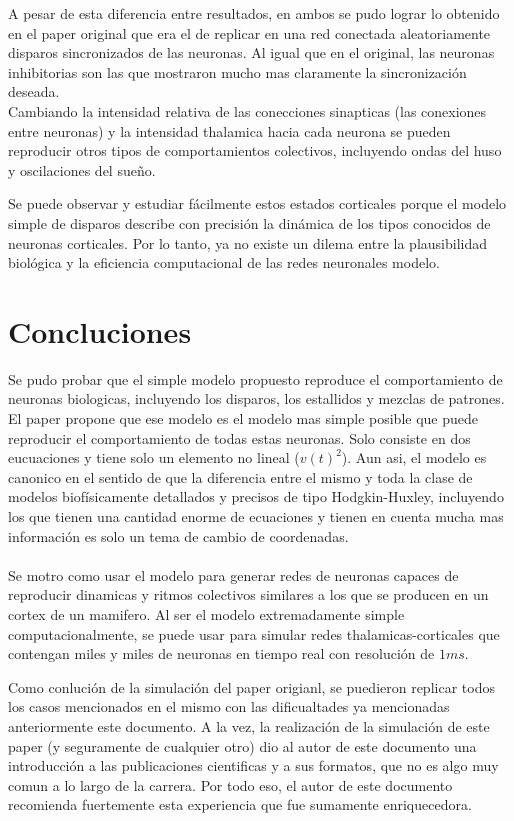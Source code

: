 \documentclass[12pt]{article}
\begin{document}
A pesar de esta diferencia entre resultados, en ambos se pudo lograr lo obtenido en el paper original que era el de replicar en una red conectada aleatoriamente disparos sincronizados de las neuronas.
Al igual que en el original, las neuronas inhibitorias son las que mostraron mucho mas claramente la sincronización deseada. \\

Cambiando la intensidad relativa de las conecciones sinapticas (las conexiones entre neuronas) y la intensidad thalamica hacia cada neurona se pueden reproducir otros tipos de comportamientos
colectivos, incluyendo ondas del huso y oscilaciones del sueño.

Se puede observar y estudiar fácilmente estos estados corticales porque el modelo simple de disparos describe con precisión la dinámica de los tipos conocidos
de neuronas corticales. Por lo tanto, ya no existe un dilema entre la plausibilidad biológica y la eficiencia computacional de las redes neuronales modelo.

\section{Concluciones}

Se pudo probar que el simple modelo propuesto reproduce el comportamiento de neuronas biologicas, incluyendo los disparos, los estallidos y mezclas de patrones. El paper propone que ese modelo es el modelo mas simple posible que puede reproducir el comportamiento de todas estas neuronas.
Solo consiste en dos eucuaciones y tiene solo un elemento no lineal ($v(t)^2$). Aun asi, el modelo es canonico en el sentido de que la diferencia entre el mismo y toda la clase de modelos biofísicamente detallados y precisos de tipo Hodgkin-Huxley, incluyendo los que tienen una cantidad enorme de ecuaciones y tienen en cuenta mucha mas información es solo un tema de cambio de coordenadas. \\ \\

Se motro como usar el modelo para generar redes de neuronas capaces de reproducir dinamicas y ritmos colectivos similares a los que se producen en un cortex de un mamifero.
Al ser el modelo extremadamente simple computacionalmente, se puede usar para simular redes thalamicas-corticales que contengan miles y miles de neuronas en tiempo real con resolución de $1 ms$.

Como conlución de la simulación del paper origianl, se puedieron replicar todos los casos mencionados en el mismo con las dificualtades ya mencionadas anteriormente este documento.
A la vez, la realización de la simulación de este paper (y seguramente de cualquier otro) dio al autor de este documento una introducción a las publicaciones cientificas y a sus formatos, que no es algo muy comun
a lo largo de la carrera. Por todo eso, el autor de este documento recomienda fuertemente esta experiencia que fue sumamente enriquecedora.
\end{document}
